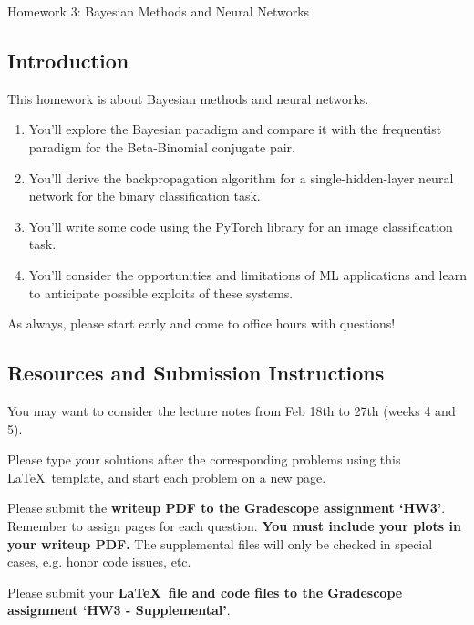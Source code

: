 \documentclass[submit]{../harvardml}
\begin{document}
\begin{center}
  {\Large Homework 3: Bayesian Methods and Neural Networks}\\
\end{center}

\subsection*{Introduction}

This homework is about Bayesian methods and neural networks.

\begin{enumerate}
  \item You'll explore the Bayesian paradigm and compare it with the frequentist paradigm for the Beta-Binomial conjugate pair.
  \item You'll derive the backpropagation algorithm for a single-hidden-layer neural network for the binary classification task.
  \item You'll write some code using the PyTorch library for an image classification task.
  \item You'll consider the opportunities and limitations of ML applications and learn to anticipate possible exploits of these systems.
\end{enumerate}

As always, please start early and come to office hours with questions!

\subsection*{Resources and Submission Instructions}
You may want to consider the lecture notes from Feb 18th to 27th (weeks 4 and 5).

Please type your solutions after the corresponding problems using this
\LaTeX\ template, and start each problem on a new page.

Please submit the \textbf{writeup PDF to the Gradescope assignment `HW3'}. Remember to assign pages for each question.  \textbf{You must include your plots in your writeup PDF. } The supplemental files will only be checked in special cases, e.g. honor code issues, etc.

Please submit your \textbf{\LaTeX\ file and code files to the Gradescope assignment `HW3 - Supplemental'}. \\


\newpage

\end{document}

